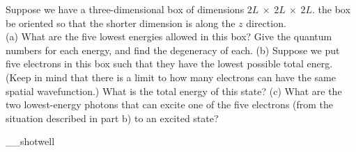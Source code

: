 Suppose we have a three-dimensional box of dimensions $2L\ \times\ 2L\ \times\ 2L$.
the box be oriented so that the shorter dimension is along the $z$ direction.\\
(a) What are the five lowest energies allowed in this box? Give the quantum numbers for each energy,
and find the degeneracy of each.\hwendpart
(b) Suppose we put five electrons in this box such that they have the lowest
possible total energ. (Keep in
mind that there is a limit to how many electrons can have the same spatial wavefunction.) What is the
total energy of this state?\answercheck\hwendpart
(c) What are the two lowest-energy photons that can excite one of the five electrons (from the situation
described in part b) to an excited state?\answercheck\hwendpart

__shotwell
